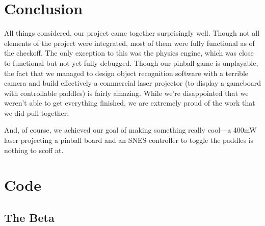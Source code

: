 \documentclass{article}
\begin{document}
\section{Conclusion}
All things considered, our project came together surprisingly well. Though not all elements of the project were integrated, most of them were fully functional as of the checkoff. The only exception to this was the physics engine, which was close to functional but not yet fully debugged. Though our pinball game is unplayable, the fact that we managed to design object recognition software with a terrible camera and build effectively a commercial laser projector (to display a gameboard with controllable paddles) is fairly amazing. While we're disappointed that we weren't able to get everything finished, we are extremely proud of the work that we did pull together.

And, of course, we achieved our goal of making something really cool---a 400mW laser projecting a pinball board and an SNES controller to toggle the paddles is nothing to scoff at.

\pagebreak
\section{Code}
\subsection{The Beta}
\end{document}
